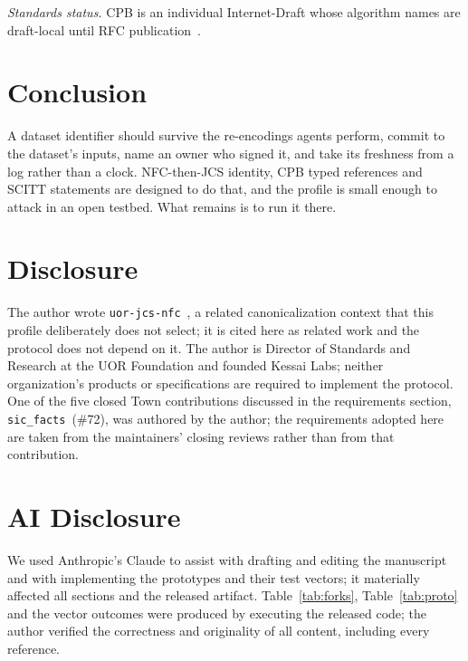 \documentclass[conference]{IEEEtran}
\begin{document}
\emph{Standards status.} CPB is an individual Internet-Draft whose algorithm names are draft-local until RFC publication~\cite{cpb03}.

\section{Conclusion}
A dataset identifier should survive the re-encodings agents perform, commit to the dataset's inputs, name an owner who signed it, and take its freshness from a log rather than a clock. NFC-then-JCS identity, CPB typed references and SCITT statements are designed to do that, and the profile is small enough to attack in an open testbed. What remains is to run it there.

\section*{Disclosure}
The author wrote \texttt{uor-jcs-nfc}~\cite{uorjcsnfc}, a related canonicalization context that this profile deliberately does not select; it is cited here as related work and the protocol does not depend on it. The author is Director of Standards and Research at the UOR Foundation and founded Kessai Labs; neither organization's products or specifications are required to implement the protocol. One of the five closed Town contributions discussed in the requirements section, \texttt{sic\_facts}~(\#72), was authored by the author; the requirements adopted here are taken from the maintainers' closing reviews rather than from that contribution.

\section*{AI Disclosure}
We used Anthropic's Claude to assist with drafting and editing the manuscript and with implementing the prototypes and their test vectors; it materially affected all sections and the released artifact. Table~\ref{tab:forks}, Table~\ref{tab:proto} and the vector outcomes were produced by executing the released code; the author verified the correctness and originality of all content, including every reference.
\end{document}
